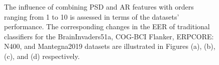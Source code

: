\begin{figure}
    
    \qquad
    \caption{The influence of combining PSD and AR features with orders ranging from 1 to 10 is assessed in terms of the datasets' performance. The corresponding changes in the EER of traditional classifiers for the BrainInvaders51a, COG-BCI Flanker, ERPCORE: N400, and Mantegna2019 datasets are illustrated in Figures (a), (b), (c), and (d) respectively.}%
    \label{fig: Feature Extraction using AR and PSD}%
\end{figure}
